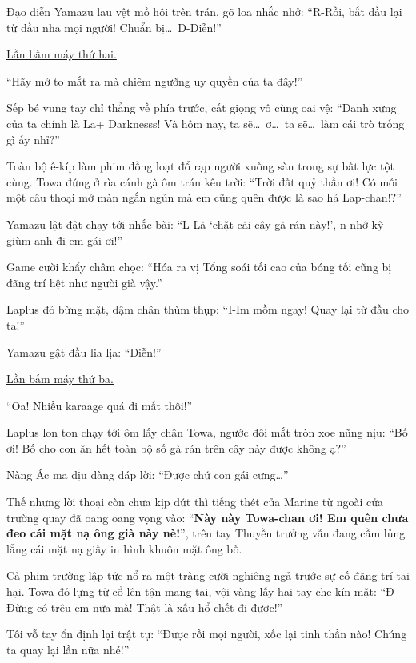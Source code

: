 \documentclass[../main.tex]{subfiles}
\begin{document}
Đạo diễn Yamazu lau vệt mồ hôi trên trán, gõ loa nhắc nhở: ``R-Rồi, bắt đầu lại từ đầu nha mọi người! Chuẩn bị\dots\ D-Diễn!''

\begin{center}
    \uline{Lần bấm máy thứ hai.}
\end{center}

``Hãy mở to mắt ra mà chiêm ngưỡng uy quyền của ta đây!''

Sếp bé vung tay chỉ thẳng về phía trước, cất giọng vô cùng oai vệ: ``Danh xưng của ta chính là La+ Darknesss! Và hôm nay, ta sẽ\dots\ ơ\dots\ ta sẽ\dots\ làm cái trò trống gì ấy nhỉ?''

Toàn bộ ê-kíp làm phim đồng loạt đổ rạp người xuống sàn trong sự bất lực tột cùng. Towa đứng ở rìa cánh gà ôm trán kêu trời: ``Trời đất quỷ thần ơi! Có mỗi một câu thoại mở màn ngắn ngủn mà em cũng quên được là sao hả Lap-chan!?''

Yamazu lật đật chạy tới nhắc bài: ``L-Là `chặt cái cây gà rán này!', n-nhớ kỹ giùm anh đi em gái ơi!''

Game cười khẩy châm chọc: ``Hóa ra vị Tổng soái tối cao của bóng tối cũng bị đãng trí hệt như người già vậy.''

Laplus đỏ bừng mặt, dậm chân thùm thụp: ``I-Im mồm ngay! Quay lại từ đầu cho ta!''

Yamazu gật đầu lia lịa: ``Diễn!''

\begin{center}
    \uline{Lần bấm máy thứ ba.}
\end{center}

``Oa! Nhiều karaage quá đi mất thôi!''

Laplus lon ton chạy tới ôm lấy chân Towa, ngước đôi mắt tròn xoe nũng nịu: ``Bố ơi! Bố cho con ăn hết toàn bộ số gà rán trên cây này được không ạ?''

Nàng Ác ma dịu dàng đáp lời: ``Được chứ con gái cưng\dots''

Thế nhưng lời thoại còn chưa kịp dứt thì tiếng thét của Marine từ ngoài cửa trường quay đã oang oang vọng vào: ``\textbf{Này này Towa-chan ơi! Em quên chưa đeo cái mặt nạ ông già này nè!}'', trên tay Thuyền trưởng vẫn đang cầm lủng lẳng cái mặt nạ giấy in hình khuôn mặt ông bố.

Cả phim trường lập tức nổ ra một tràng cười nghiêng ngả trước sự cố đãng trí tai hại. Towa đỏ lựng từ cổ lên tận mang tai, vội vàng lấy hai tay che kín mặt: ``Đ-Đừng có trêu em nữa mà! Thật là xấu hổ chết đi được!''

Tôi vỗ tay ổn định lại trật tự: ``Được rồi mọi người, xốc lại tinh thần nào! Chúng ta quay lại lần nữa nhé!''
\end{document}
